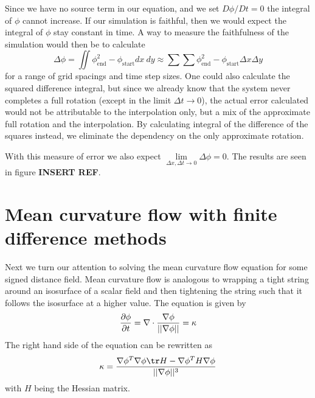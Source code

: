 \documentclass[sigconf]{acmart}
\begin{document}
Since we have no source term in our equation, and we set $ D\phi/Dt = 0$ the integral of $ \phi $ cannot increase. If our simulation is faithful, then we would expect the integral of $ \phi $ stay constant in time. A way to measure the faithfulness of the simulation would then be to calculate
\begin{equation}\label{key}
	\Delta\phi = \iint \phi_{\text{end}}^2 - \phi_{\text{start}} dx\ dy \approx \sum\sum \phi_{\text{end}}^2 - \phi_{\text{start}} \Delta x \Delta y
\end{equation}
for a range of grid spacings and time step sizes. One could also calculate the squared difference integral, but since we already know that the system never completes a full rotation (except in the limit $ \Delta t \to 0 $), the actual error calculated would not be attributable to the interpolation only, but a mix of the approximate full rotation and the interpolation. By calculating integral of the difference of the squares instead, we eliminate the dependency on the only approximate rotation.

With this measure of error we also expect $ \lim\limits_{\Delta x, \Delta t \to 0} \Delta \phi = 0 $. The results are seen in figure \textbf{INSERT REF}.


\section{Mean curvature flow with finite difference methods}
Next we turn our attention to solving the mean curvature flow equation for some signed distance field. Mean curvature flow is analogous to wrapping a tight string around an isosurface of a scalar field and then tightening the string such that it follows the isosurface at a higher value. The equation is given by
\begin{equation}\label{key}
	\frac{\partial \phi}{\partial t} = \nabla \cdot \frac{\nabla \phi}{||\nabla \phi ||} = \kappa
\end{equation}
The right hand side of the equation can be rewritten as
\begin{equation}\label{key}
	\kappa = \frac{\grad \phi^T \grad \phi \tr H  - \grad\phi^T H \grad\phi}{||\grad\phi||^3}
\end{equation}
with $ H $ being the Hessian matrix.
\end{document}
